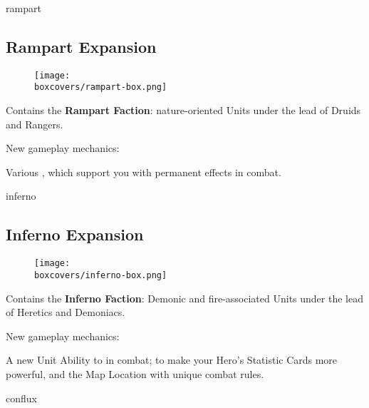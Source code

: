 \begin{multicols}{2}
\columnbreak
\begin{expansion}[title=]{rampart}
  \subsection*{\color{rampart}Rampart Expansion}
  \setlength\intextsep{0pt}
  \setlength\columnsep{0.8em}
  \begin{wrapfigure}{l}{0.35\textwidth}
    \texttt{[image: \\boxcovers/rampart-box.png]}
  \end{wrapfigure}
  Contains the \textbf{Rampart Faction}: nature-oriented Units under the lead of Druids and Rangers.\par
  \medskip
  New gameplay mechanics:\par
  \smallskip
  Various , which support you with permanent effects in combat.
\end{expansion}

\vspace*{1em}
\begin{expansion}[title=]{inferno}
  \subsection*{\color{inferno}Inferno Expansion}
  \setlength\intextsep{0pt}
  \setlength\columnsep{0.8em}
  \begin{wrapfigure}{l}{0.35\textwidth}
    \texttt{[image: \\boxcovers/inferno-box.png]}
  \end{wrapfigure}
  Contains the \textbf{Inferno Faction}: Demonic and fire-associated Units under the lead of Heretics and Demoniacs.\par
  \medskip
  New gameplay mechanics:\par
  \smallskip
  A new Unit Ability to  in combat;  to make your Hero's Statistic Cards more powerful, and the  Map Location with unique combat rules.
\end{expansion}

\vspace*{1em}
\begin{expansion}[title=]{conflux}

\end{expansion}
\end{multicols}
